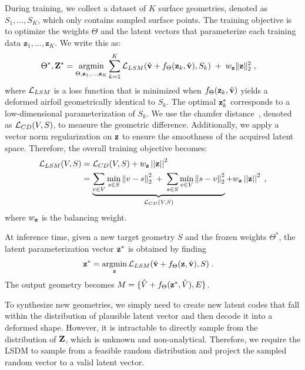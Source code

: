During training, we collect a dataset of $K$ surface geometries, denoted as $S_1,\ldots,S_K$, which only contains sampled surface points. The training objective is to optimize the weights $\Theta$ and the latent vectors that parameterize each training data $\textbf{z}_1,\ldots,\textbf{z}_K$. We write this as:
\begin{align}
  \Theta^*,\bZ^* 
    &=  \argmin_{\Theta,\bz_1,\ldots,\bz_K} \sum_{k=1}^K \cL_{LSM}(\hat{\bv} + f_{\Theta}(\bz_k, \hat{\bv}), S_k)
  \;+\;w_{\bz}\|\bz\|_2^2 \;,
\label{ch6:eq:argmin_f_z_theta}
\end{align}
where $\mathcal{L}_{LSM}$ is a loss function that is minimized when $f_{\Theta}(\mathbf{z}_k, \hat{\mathbf{v}})$ yields a deformed airfoil geometrically identical to $S_k$. The optimal $\mathbf{z}_k^*$ corresponds to a low-dimensional parameterization of $S_k$. We use the chamfer distance~\cite{ai.Barrow1977}, denoted as $\mathcal{L}_{CD}(V, S)$, to measure the geometric difference.  Additionally, we apply a vector norm regularization on $\mathbf{z}$ to ensure the smoothness of the acquired latent space. Therefore, the overall training objective becomes:
\begin{align}
  \mathcal{L}_{LSM}(V, S) 
    &= \mathcal{L}_{CD}(V, S) + w_{\mathbf{z}}\left|\left|\mathbf{z}\right|\right|^2 \nonumber \\
    &= \underbrace{\sum_{v\in V}\min_{s\in S}\left\|v - s\right\|_2^2\;+\;\sum_{s\in S}\min_{v\in V}\left\|s - v\right\|_2^2}_{\mathcal{L}_{CD}(V,S)}  + w_{\mathbf{z}}\left|\left|\mathbf{z}\right|\right|^2 \; ,
\end{align}
where $w_{\mathbf{z}}$ is the balancing weight.

At inference time, given a new target geometry $S$ and the frozen weights $\Theta^*$, the latent parameterization vector $\mathbf{z}^*$ is obtained by finding
%
\begin{align}
  \bz^* &=  \argmin_{\bz} \cL_{LSM}(\hat{\bv} + f_{\Theta}(\bz, \hat{\bv}), S) \; .
\label{ch6:eq:agmin_f_z}
\end{align}
%
The output geometry becomes $M=\{\hat{V} + f_{\Theta}(\mathbf{z}^*, \hat{V}), E\}$. 

To synthesize new geometries, we simply need to create new latent codes that fall within the distribution of plausible latent vector and then decode it into a deformed shape. However, it is intractable to directly sample from the distribution of $\mathbf{Z}$, which is unknown and non-analytical. Therefore, we require the LSDM to sample from a feasible random distribution and project the sampled random vector to a valid latent vector.

